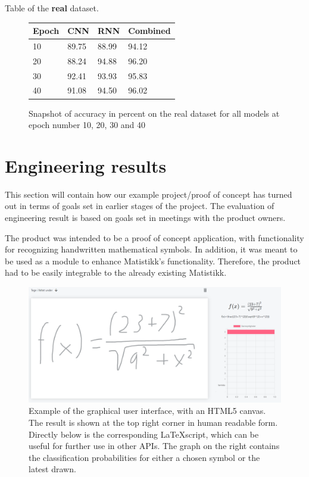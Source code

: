 Table of the \textbf{real} dataset.
\begin{figure}[H]
    \centering
    \begin{tabular}{| p{2cm} | p{3cm} | p{3cm} | p{3cm} |}
    \hline
    Epoch & \textbf{CNN} & \textbf{RNN} & \textbf{Combined} \\ \hline
    10 & 89.75 & 88.99 & 94.12 \\ \hline
    20 & 88.24 & 94.88 & 96.20 \\ \hline
    30 & 92.41 & 93.93 & 95.83 \\ \hline
    40 & 91.08 & 94.50 & 96.02 \\ \hline
    \end{tabular}
    \caption{Snapshot of accuracy in percent on the real dataset for all models at epoch number 10, 20, 30 and 40}
    \label{fig:table_real_dataset}

\end{figure}

\section{Engineering results}
This section will contain how our example project/proof of concept has turned out in terms of goals set in earlier stages of the project. The evaluation of engineering result is based on goals set in meetings with the product owners. %

The product was intended to be a proof of concept application, with functionality for recognizing handwritten mathematical symbols. In addition, it was meant to be used as a module to enhance Matistikk's functionality. Therefore, the product had to be easily integrable to the already existing Matistikk. 


\begin{figure}[H]
    \centering
    \includegraphics[width=\textwidth]{Assets/Chapter4_Result/predictor_example.png}
    \caption{Example of the graphical user interface, with an HTML5 canvas. The result is shown at the top right corner in human readable form. Directly below is the corresponding \LaTeX script, which can be useful for further use in other APIs. The graph on the right contains the classification probabilities for either a chosen symbol or the latest drawn.}
    \label{fig:predictor_example}
\end{figure}

